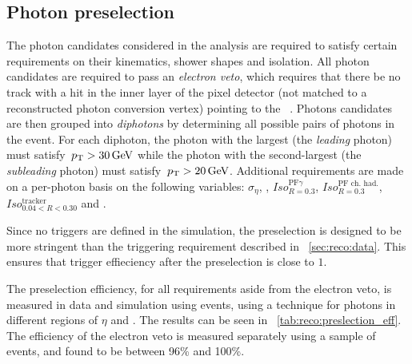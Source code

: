 \subsection{Photon preselection}
 \label{reco:sec:pho:preselection}

The photon candidates considered in the \Hgg analysis are required to satisfy certain requirements on their kinematics, shower shapes and isolation. All photon candidates are required to pass an \emph{electron veto}, which requires that there be no track with a hit in the inner layer of the pixel detector (not matched to a reconstructed photon conversion vertex) pointing to the \SC~\cite{CMS-PAS-EGM-14-001}. Photons candidates are then grouped into \emph{diphotons} by determining all possible pairs of photons in the event. For each diphoton, the photon with the largest \pT (the \emph{leading} photon) must satisfy $\,p_\text{T}>30\,\text{Ge\hspace{-.08em}V}$ while the photon with the second-largest \pT (the \emph{subleading} photon) must satisfy $\,p_\text{T}>20\,\text{Ge\hspace{-.08em}V}$. Additional requirements are made on a per-photon basis on the following variables: $\sigma_{\eta}$, \HoE, $Iso^{\textrm{PF}\gamma}_{R=0.3}$, $Iso^{\textrm{PF ch. had.}}_{R=0.3}$, $Iso^{\textrm{tracker}}_{0.04<R<0.30}$ and \RNINE. 

Since no triggers are defined in the simulation, the preselection is designed to be more stringent than the triggering requirement described in \Sec~\ref{sec:reco:data}. This ensures that trigger effieciency after the preselection is close to $1$.

The preselection efficiency, for all requirements aside from the electron veto, is measured in data and simulation using \Zee events, using a \TagAndProbe technique for photons in different regions of $\eta$ and \RNINE. The results can be seen in \Table~\ref{tab:reco:preslection_eff}. The efficiency of the electron veto is measured separately using a sample of \Zmmg events, and found to be between 96\% and 100\%.

